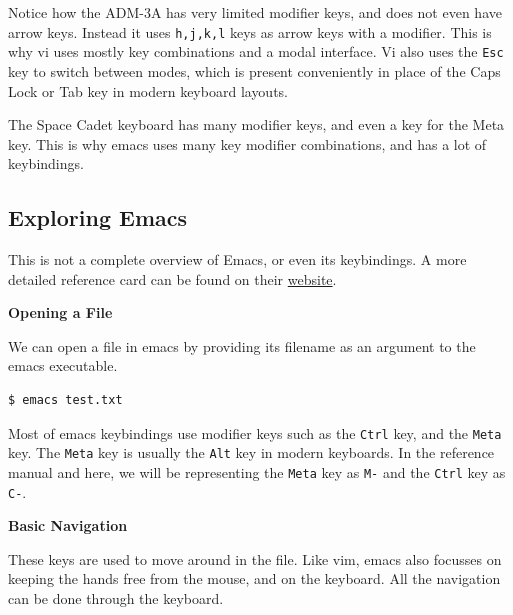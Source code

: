 Notice how the ADM-3A has very limited modifier keys, and
does not even have arrow keys. Instead it uses \texttt{h,j,k,l}
keys as arrow keys with a modifier. This is why vi uses
mostly key combinations and a modal interface.
Vi also uses the \texttt{Esc} key to switch between modes,
which is present conveniently in place of the Caps Lock or Tab key
in modern keyboard layouts.

The Space Cadet keyboard has many modifier keys, and even
a key for the Meta key. This is why emacs uses many key
modifier combinations, and has a lot of keybindings.

\subsection{Exploring Emacs}

This is not a complete overview of Emacs, or even its
keybindings. A more detailed reference card can be
found on their
\href{https://www.gnu.org/software/emacs/refcards/pdf/refcard.pdf}{website}.

\textbf{Opening a File}

We can open a file in emacs by providing its
filename as an argument to the emacs executable.

\begin{lstlisting}[language=bash]
$ emacs test.txt
\end{lstlisting}

Most of emacs keybindings use modifier keys such as
the \texttt{Ctrl} key, and the \texttt{Meta} key.
The \texttt{Meta} key is usually the \texttt{Alt} key
in modern keyboards. In the reference manual and here,
we will be representing the \texttt{Meta} key as \texttt{M-}
and the \texttt{Ctrl} key as \texttt{C-}.

\textbf{Basic Navigation}

These keys are used to move around in the file.
Like vim, emacs also focusses on keeping the hands
free from the mouse, and on the keyboard.
All the navigation can be done through the keyboard.

